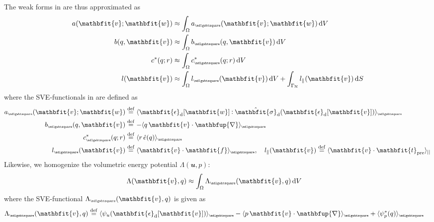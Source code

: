\documentclass[12pt,a4paper]{article}
\renewcommand{\ta}[1]{\mathbfit{#1}}
\renewcommand{\ts}[1]{\mathbfit{#1}}
\renewcommand{\diff}{\mathbfup{\nabla}}
\renewcommand{\Box}{\mdlgwhtsquare}
\DeclarePairedDelimiter{\homgen}{\langle}{\rangle_\rve}
\newcommand{\prescribed}{\mathrm{pre}}
\renewcommand{\dev}{\mathrm{d}}
\newcommand{\rve}{
  {\mathchoice
   {\mbox{\scalebox{0.67}{$\Box$}}}
   {\mbox{\scalebox{0.67}{$\Box$}}}
   {\mbox{\scalebox{0.5}{$\Box$}}}
   {\mbox{\scalebox{0.375}{$\Box$}}}
  }
}
\begin{document}
The weak forms in  are thus approximated as
\begin{align}
    a(\ta{v};\ta{w}) &\approx \int_\Omega a_\rve(\ta{v};\ta{w}) \dif V
\label{eq7a} \\
    b(q,\ta{v}) &\approx \int_\Omega b_\rve(q,\ta{v}) \dif V
\label{eq7b} \\
    c^*(q;r) &\approx \int_\Omega c^*_\rve(q;r) \dif V
\label{eq7c} \\
    l(\ta{v}) &\approx \int_\Omega l_\rve(\ta{v}) \dif V + \int_{\Gamma_\Neumann} l_\parallel(\ta{v}) \dif S
\label{eq7d}
\end{align}
where the SVE-functionals in  are defined as
\begin{align}
    a_\rve(\ta{v};\ta{w}) &\defeq
    \homgen{ \ts{\epsilon}_\dev[\ta{w}]\dprod \hat{\ts{\sigma}}_\dev(\ts{\epsilon}_\dev[\ta{v}]) }
\label{eq8a} \\
    b_\rve(q,\ta{v}) &\defeq
    -  \homgen{ q\,\ta{v}\cdot\diff }
\label{eq8b} \\
    c^*_\rve(q;r) &\defeq
    \homgen{ r\,\hat{e}(q) }
\label{eq8c} \\
    l_\rve(\ta{v}) &\defeq
    \homgen{ \ta{v}\cdot\ta{f} }, \quad
    l_\parallel(\ta{v}) \defeq
    \langle \ta{v}\cdot \ta t_\prescribed \rangle_{||}
\label{eq8d}
\end{align}
Likewise, we homogenize the volumetric energy potential $\Lambda(\ta{u},p)$:
\begin{align}
    \Lambda(\ta{v},q) &\approx \int_\Omega \Lambda_\rve(\ta{v},q) \dif V
\label{eq222}
\end{align}
where the SVE-functional $\Lambda_\rve(\ta{v},q)$ is given as
\begin{align}
    \Lambda_\rve(\ta{v},q) &\defeq
    \homgen{ \psi_u(\ts{\epsilon}_\dev[\ta{v}])} -
    \homgen{  p\,\ta{v}\cdot\diff } + \homgen{ \psi_p^*(q) }
\label{eqRveBulkPotential}
\end{align}
\end{document}

